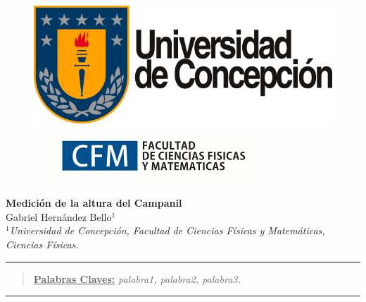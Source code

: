 \documentclass[10pt,a4paper]{article}
\author{Gabriel Hernandez Bello}
\begin{document}
	
	\begin{figure}[H]
		\raggedright
		\includegraphics[scale=0.2]{IMG/logo_udec.png} \hfill \includegraphics[scale=0.5]{IMG/cfm_logo.png}
	\end{figure}

	\vspace{6mm}
	\begin{center}
		{\Large \textbf{Medición de la altura del Campanil}}\\
		\vspace{2mm}
		{\large Gabriel Hernández Bello$^{1}$}\\
		\vspace{6.5mm}
		$^1$\textit{Universidad de Concepción, Facultad de Ciencias Físicas y Matemáticas, Ciencias Físicas. }\\
	\end{center}

	\begin{center}
		\textcolor{pinegreen}{\rule{150mm}{0.8mm}}
	\end{center}

	\begin{abstract}
		\underline{\textbf{Palabras Claves:}} \hspace{2mm} \textit{palabra1, palabra2, palabra3.}
	\end{abstract}
	
	\begin{center}
		\textcolor{pinegreen}{\rule{150mm}{0.8mm}}
	\end{center}
	
\end{document}
